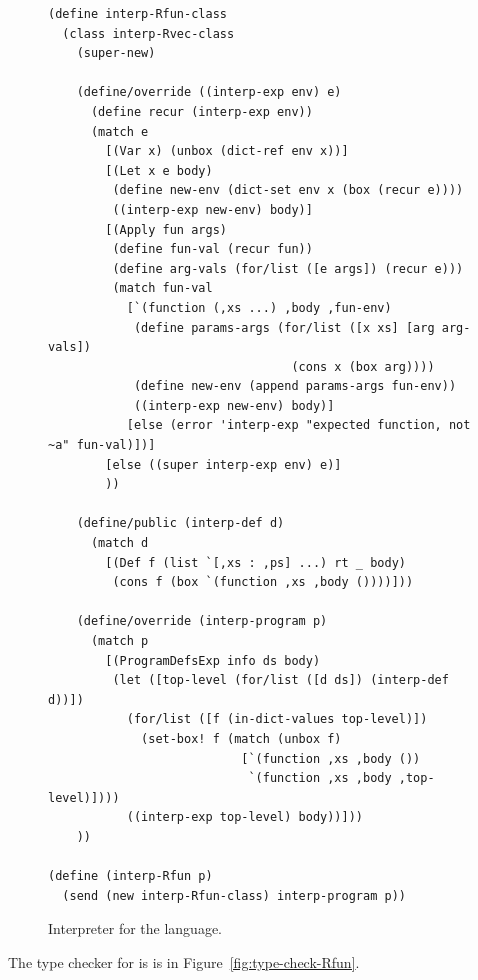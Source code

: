 \documentclass[11pt]{book}
\newcommand{\margincomment}[1]{\marginpar{\color{comment-red}\tiny #1}}
\newcommand{\margincomment}[1]{}
\begin{document}
\begin{figure}[tp]
\begin{lstlisting}
(define interp-Rfun-class
  (class interp-Rvec-class
    (super-new)

    (define/override ((interp-exp env) e)
      (define recur (interp-exp env))
      (match e
        [(Var x) (unbox (dict-ref env x))]
        [(Let x e body)
         (define new-env (dict-set env x (box (recur e))))
         ((interp-exp new-env) body)]
        [(Apply fun args)
         (define fun-val (recur fun))
         (define arg-vals (for/list ([e args]) (recur e)))
         (match fun-val
           [`(function (,xs ...) ,body ,fun-env)
            (define params-args (for/list ([x xs] [arg arg-vals])
                                  (cons x (box arg))))
            (define new-env (append params-args fun-env))
            ((interp-exp new-env) body)]
           [else (error 'interp-exp "expected function, not ~a" fun-val)])]
        [else ((super interp-exp env) e)]
        ))

    (define/public (interp-def d)
      (match d
        [(Def f (list `[,xs : ,ps] ...) rt _ body)
         (cons f (box `(function ,xs ,body ())))]))

    (define/override (interp-program p)
      (match p
        [(ProgramDefsExp info ds body)
         (let ([top-level (for/list ([d ds]) (interp-def d))])
           (for/list ([f (in-dict-values top-level)])
             (set-box! f (match (unbox f)
                           [`(function ,xs ,body ())
                            `(function ,xs ,body ,top-level)])))
           ((interp-exp top-level) body))]))
    ))

(define (interp-Rfun p)
  (send (new interp-Rfun-class) interp-program p))
\end{lstlisting}
\caption{Interpreter for the \LangFun{} language.}
\label{fig:interp-Rfun}
\end{figure}


\margincomment{TODO: explain type checker}

The type checker for \LangFun{} is is in Figure~\ref{fig:type-check-Rfun}.
\end{document}
